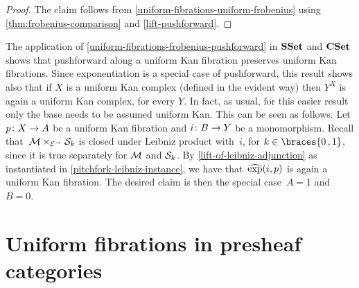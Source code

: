 \documentclass[reqno,10pt,a4paper,oneside,draft]{amsart}
\begin{document}
{{\begin{proof}
The claim follows from \cref{uniform-fibrations-uniform-frobenius} using \cref{thm:frobenius-comparison} and \cref{lift-pushforward}.
\end{proof}

\begin{example}
The application of \cref{uniform-fibrations-frobenius-pushforward} in $\SSet$ and $\CSet$ shows that pushforward along a uniform Kan fibration preserves uniform Kan fibrations.
Since exponentiation is a special case of pushforward, this result shows also that if $X$ is a uniform Kan complex (defined in the evident way) then $Y^X$ is again a uniform Kan complex,
for every $Y$.
In fact, as usual, for this easier result only the base needs to be assumed uniform Kan.
This can be seen as follows.
Let $p \co X \to A$ be a uniform Kan fibration and $i \co B \to Y$ be a monomorphism.
Recall that~$\cal{M} \times_{\cal{E}^\to} \cal{S}_k$ is closed under Leibniz product with~$i$, for $k \in \braces{0\,, 1}$, since it is true separately for $\cal{M}$ and $\cal{S}_k$.
By \cref{lift-of-leibniz-adjunction} as instantiated in \cref{pitchfork-leibniz-instance}, we have that~$\hatexp(i, p)$ is again a uniform Kan fibration.
The desired claim is then the special case~$A = 1$ and~$B = 0$.
\end{example}

\section{Uniform fibrations in presheaf categories}
\label{sec:fib-psh}

}}
\end{document}

